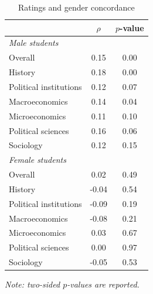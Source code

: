 \documentclass[12pt]{article}
\begin{document}
\begin{table}[htbp]
  \centering
  \footnotesize 
  \caption{Ratings and gender concordance}
    \begin{tabular}{lcc}
    \toprule 
                          & $\rho$  & $p$-value   \\
   \midrule
     \multicolumn{3}{l}{\textit{Male students}} \\     
      \quad  Overall &                 0.15       & 0.00       \\
      \quad  History &                 0.18       & 0.00       \\
      \quad  Political institutions &  0.12       & 0.07        \\
      \quad  Macroeconomics &          0.14       & 0.04        \\
      \quad  Microeconomics &          0.11       & 0.10        \\
      \quad  Political sciences &      0.16       & 0.06       \\
      \quad  Sociology &               0.12       & 0.15       \\
   \midrule
     \multicolumn{3}{l}{\textit{Female students}} \\     
      \quad  Overall &                  0.02       & 0.49      \\
      \quad  History &                 -0.04       & 0.54       \\
      \quad  Political institutions &  -0.09       & 0.19       \\
      \quad  Macroeconomics &          -0.08       & 0.21       \\
      \quad  Microeconomics &           0.03       & 0.67       \\
      \quad  Political sciences &       0.00       & 0.97       \\
      \quad  Sociology &               -0.05       & 0.53       \\
    \bottomrule
    \end{tabular}%
 \label{tab:gender concordance}%
  
  \textit{Note: two-sided $p$-values are reported.}
\end{table}%
\normalsize
\end{document}
